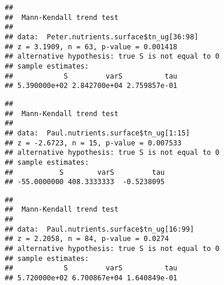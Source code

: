 \documentclass[]{article}
\newenvironment{Shaded}{\begin{snugshade}}{\end{snugshade}}
\newcommand{\KeywordTok}[1]{\textcolor[rgb]{0.13,0.29,0.53}{\textbf{#1}}}
\newcommand{\DecValTok}[1]{\textcolor[rgb]{0.00,0.00,0.81}{#1}}
\newcommand{\CommentTok}[1]{\textcolor[rgb]{0.56,0.35,0.01}{\textit{#1}}}
\newcommand{\OperatorTok}[1]{\textcolor[rgb]{0.81,0.36,0.00}{\textbf{#1}}}
\newcommand{\NormalTok}[1]{#1}
\begin{document}
\begin{Shaded}
\end{Shaded}

\begin{verbatim}
## 
##  Mann-Kendall trend test
## 
## data:  Peter.nutrients.surface$tn_ug[36:98]
## z = 3.1909, n = 63, p-value = 0.001418
## alternative hypothesis: true S is not equal to 0
## sample estimates:
##            S         varS          tau 
## 5.390000e+02 2.842700e+04 2.759857e-01
\end{verbatim}

\begin{Shaded}
\end{Shaded}

\begin{verbatim}
## 
##  Mann-Kendall trend test
## 
## data:  Paul.nutrients.surface$tn_ug[1:15]
## z = -2.6723, n = 15, p-value = 0.007533
## alternative hypothesis: true S is not equal to 0
## sample estimates:
##           S        varS         tau 
## -55.0000000 408.3333333  -0.5238095
\end{verbatim}

\begin{Shaded}
\end{Shaded}

\begin{verbatim}
## 
##  Mann-Kendall trend test
## 
## data:  Paul.nutrients.surface$tn_ug[16:99]
## z = 2.2058, n = 84, p-value = 0.0274
## alternative hypothesis: true S is not equal to 0
## sample estimates:
##            S         varS          tau 
## 5.720000e+02 6.700867e+04 1.640849e-01
\end{verbatim}

\begin{Shaded}
\end{Shaded}
\end{document}
